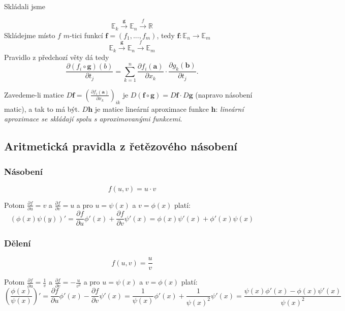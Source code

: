 \documentclass[../main.tex]{subfiles}
\begin{document}
Skládali jsme

\[\mathbb{E}_k \xrightarrow{\mathbf{g}} \mathbb{E}_n \xrightarrow{\textit{f}} \mathbb{R} \]
Skládejme místo $f$ $m$-tici funkcí
$\mathbf{f} = (f_1,...,f_m)$, tedy $\mathbf{f}: \mathbb{E}_n \rightarrow \mathbb{E}_m$
\[\mathbb{E}_k \xrightarrow{\mathbf{g}} \mathbb{E}_n \xrightarrow{\textit{f}} \mathbb{E}_m \]
Pravidlo z předchozí věty dá tedy
\[\frac{\partial (f_i \circ \mathbf{g})(b)}{\partial t_j} = \sum^n_{k=1} \frac{\partial f_i(\mathbf{a})}{\partial x_k}
\cdot \frac{\partial g_k(\mathbf{b})}{\partial t_j}.\]

Zavedeme-li matice $D\mathbf{f} = \left(\frac{\partial f_i(\mathbf{a})}{\partial x_k}\right)_{ik}$ je 
$D(\mathbf{f}\circ \mathbf{g}) = D\mathbf{f}\cdot D\mathbf{g}$ (napravo násobení matic), a tak to má být. $D\mathbf{h}$ je matice lineární aproximace 
funkce $\mathbf{h}$: \textit{lineární aproximace se skládají spolu s aproximovanými funkcemi}.
\noindent

\subsection{Aritmetická pravidla z řetězového násobení}
\subsubsection{Násobení}
\[ f(u,v) = u \cdot v \]

\hspace{1.2mm}
\noindent
Potom $ \frac{\partial f}{\partial u} = v $ a $ \frac{\partial f}{\partial v} = u $
a pro $u = \psi (x)$ a $ v = \phi (x) $ platí:
\[ (\phi (x) \psi (y))' =
\frac{\partial f}{\partial u} \phi '(x) + \frac{\partial f}{\partial v} \psi '(x) = 
\phi (x)\psi '(x) + \phi '(x)\psi (x)  \]

\subsubsection{Dělení}
\[ f(u,v) = \frac{u}{v} \]

\hspace{1.2mm}
\noindent
Potom $ \frac{\partial f}{\partial u} = \frac{1}{v} $ a $ \frac{\partial f}{\partial v} = -\frac{u}{v^2} $
a pro $u = \psi (x)$ a $ v = \phi (x) $ platí:
\[ \left( \frac{\phi (x)}{\psi (x)} \right)' =
\frac{\partial f}{\partial u} \phi '(x) - \frac{\partial f}{\partial v} \psi '(x) =
\frac{1}{\psi (x)} \phi '(x) + \frac{1}{\psi (x)^2}\psi '(x) =
\frac{\psi (x)\phi '(x) - \phi (x)\psi '(x)}{\psi (x)^2} \]
\end{document}
